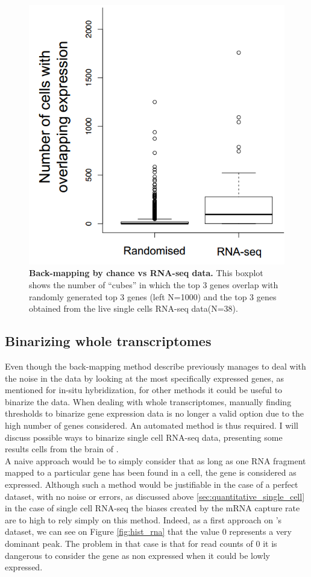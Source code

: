 	\begin{figure}[H]
\centerline{\includegraphics[width=0.6\linewidth]{gfx/chapter2/rand_top3.png}}
\caption{{\bf Back-mapping by chance vs RNA-seq data.} This boxplot shows the number of ``cubes'' in which the top 3 genes overlap with randomly generated top 3 genes (left N=1000) and the top 3 genes obtained from the live single cells RNA-seq data(N=38).}\label{fig:boxplot_rna}
	\end{figure}
	
  \subsection{Binarizing whole transcriptomes}
  
  Even though the back-mapping method describe previously manages to deal with the noise in the data by looking at the most specifically expressed genes, as mentioned for in-situ hybridization, for other methods it could be useful to binarize the data. When dealing with whole transcriptomes, manually finding thresholds to binarize gene expression data is no longer a valid option due to the high number of genes considered. An automated method is thus required. I will discuss possible ways to binarize single cell RNA-seq data, presenting some results cells from the brain of \platy{}.\\
  
  A naive approach would be to simply consider that as long as one RNA fragment mapped to a particular gene has been found in a cell, the gene is considered as expressed. Although such a method would be justifiable in the case of a perfect dataset, with no noise or errors, as discussed above \ref{sec:quantitative_single_cell} in the case of single cell RNA-seq the biases created by the mRNA capture rate are to high to rely simply on this method. Indeed, as a first approach on \platy{}'s dataset, we can see on Figure \ref{fig:hist_rna} that the value $0$ represents a very dominant peak. The problem in that case is that for read counts of $0$ it is dangerous to consider the gene as non expressed when it could be lowly expressed.\\
  
